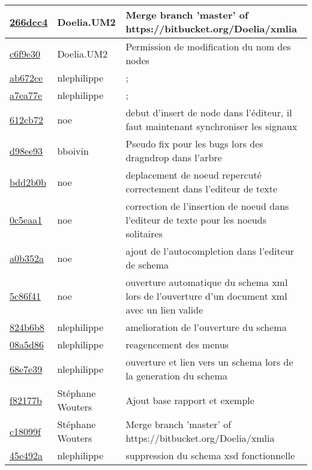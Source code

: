 \begin{tabular}{l l l}
\href{266dcc449b06a1ef3244ecb5fbe8323d0d597567}{266dcc4} & Doelia.UM2 & Merge branch 'master' of https://bitbucket.org/Doelia/xmlia\\\hline
\href{c6f9e3024ad3823a6316a4203506a529e437e608}{c6f9e30} & Doelia.UM2 & Permission de modification du nom des nodes\\\hline
\href{ab672ce297a8e15e7efa04ff0f3bc9d19c56ae5a}{ab672ce} & nlephilippe & ;\\\hline
\href{a7ea77efd3f4c1bd9547d6a9ae577810fffd80be}{a7ea77e} & nlephilippe & ;\\\hline
\href{612cb72c6b1202b0273e10591cfc89e12a67e58b}{612cb72} & noe & debut d'insert de node dans l'éditeur, il faut maintenant synchroniser les signaux\\\hline
\href{d98ee9313b2e569aa16b7c5edf471630349a7a06}{d98ee93} & bboivin & Pseudo fix pour les bugs lors des dragndrop dans l'arbre\\\hline
\href{bdd2b0ba37b762f4fc75027404afccbabac85f9b}{bdd2b0b} & noe & deplacement de noeud repercuté correctement dans l'editeur de texte\\\hline
\href{0c5eaa138a53080c163d7eb2ef43ac6db47ea44e}{0c5eaa1} & noe & correction de l'insertion de noeud dans l'editeur de texte pour les noeuds solitaires\\\hline
\href{a0b352a5430d35f25e116f1ecdd7f6dedd1836fd}{a0b352a} & noe & ajout de l'autocompletion dans l'editeur de schema\\\hline
\href{5c86f41b95cb00e70dee55c7e679c018f2cc52aa}{5c86f41} & noe & ouverture automatique du schema xml lors de l'ouverture d'un document xml avec un lien valide\\\hline
\href{824b6b8b1fe1c7917656adaadb8177dd973db719}{824b6b8} & nlephilippe & amelioration de l'ouverture du schema\\\hline
\href{08a5d86d8b83266f6bb087bcd8f618484af66a44}{08a5d86} & nlephilippe & reagencement des menus\\\hline
\href{68e7e39e7f0f470cfa68a23e173c94a9e039048a}{68e7e39} & nlephilippe & ouverture et lien vers un schema lors de la generation du schema\\\hline
\href{f82177b6e746ee18f6142a2cf903b191034278d5}{f82177b} & Stéphane Wouters & Ajout base rapport et exemple\\\hline
\href{c18099f03b48de0b0a5aac0a609c77232e4d9f5e}{c18099f} & Stéphane Wouters & Merge branch 'master' of https://bitbucket.org/Doelia/xmlia\\\hline
\href{45e492adaed8c25b0d7386417e33afbf91019e58}{45e492a} & nlephilippe & suppression du schema xsd fonctionnelle\\\hline

\end{tabular}
